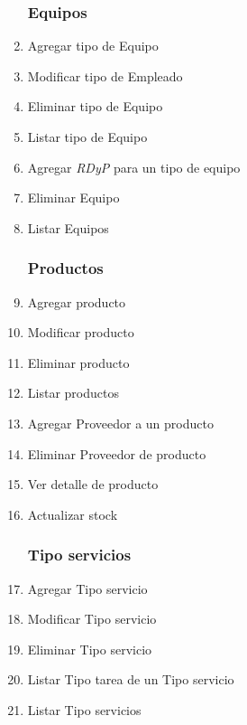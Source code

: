 \documentclass[12pt]{extarticle}
\begin{document}
\begin{spacing}{1.2}
\begin{multicols}{2}
\begin{enumerate}
        \subsubsection*{Equipos}
            \item Agregar tipo de Equipo
            \item Modificar tipo de Empleado
            \item Eliminar tipo de Equipo
            \item Listar tipo de Equipo
            \item Agregar \textit{RDyP} para un tipo de equipo
            \item Eliminar Equipo
            \item Listar Equipos
        \subsubsection*{Productos}
            \item Agregar producto
            \item Modificar producto
            \item Eliminar producto
            \item Listar productos
            \item Agregar Proveedor a un producto
            \item Eliminar Proveedor de producto
            \item Ver detalle de producto
            \item Actualizar stock
        \subsubsection*{Tipo servicios}
            \item Agregar Tipo servicio
            \item Modificar Tipo servicio
            \item Eliminar Tipo servicio
            \item Listar Tipo tarea de un Tipo servicio
            \item Listar Tipo servicios

\end{enumerate}
\end{multicols}
\end{spacing}
\end{document}
